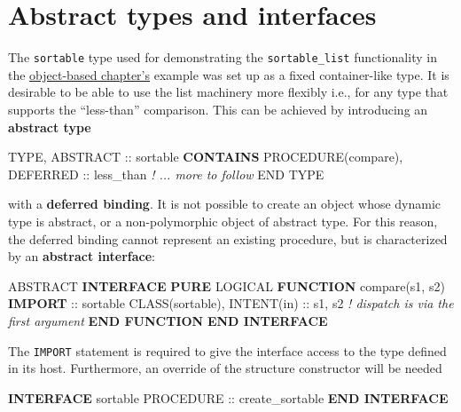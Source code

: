 \documentclass[
  paper=a4,
  ,captions=tableheading
]{scrartcl}
\newenvironment{Shaded}{\begin{snugshade}}{\end{snugshade}}
\newcommand{\CommentTok}[1]{\textcolor[rgb]{0.56,0.35,0.01}{\textit{#1}}}
\newcommand{\DataTypeTok}[1]{\textcolor[rgb]{0.13,0.29,0.53}{#1}}
\newcommand{\KeywordTok}[1]{\textcolor[rgb]{0.13,0.29,0.53}{\textbf{#1}}}
\newcommand{\NormalTok}[1]{#1}
\begin{document}
\section{Abstract types and
interfaces}\label{abstract-types-and-interfaces}

The \texttt{sortable} type used for demonstrating the
\texttt{sortable\_list} functionality in the
\hyperref[sec:oop_techniques]{object-based chapter's} example was set up
as a fixed container-like type. It is desirable to be able to use the
list machinery more flexibly i.e., for any type that supports the
``less-than'' comparison. This can be achieved by introducing an
\textbf{abstract type}

\begin{Shaded}
\begin{Highlighting}[]
\DataTypeTok{TYPE}\NormalTok{, }\DataTypeTok{ABSTRACT} \DataTypeTok{::}\NormalTok{ sortable}
\KeywordTok{CONTAINS}
   \DataTypeTok{PROCEDURE(compare)}\NormalTok{, }\DataTypeTok{DEFERRED} \DataTypeTok{::}\NormalTok{ less\_than}
   \CommentTok{! ... more to follow}
\DataTypeTok{END TYPE}
\end{Highlighting}
\end{Shaded}

with a \textbf{deferred binding}. It is not possible to create an object
whose dynamic type is abstract, or a non-polymorphic object of abstract
type. For this reason, the deferred binding cannot represent an existing
procedure, but is characterized by an \textbf{abstract interface}:

\begin{Shaded}
\begin{Highlighting}[]
\DataTypeTok{ABSTRACT} \KeywordTok{INTERFACE}
   \KeywordTok{PURE} \DataTypeTok{LOGICAL} \KeywordTok{FUNCTION}\NormalTok{ compare(s1, s2)}
      \KeywordTok{IMPORT} \DataTypeTok{::}\NormalTok{ sortable}
      \DataTypeTok{CLASS(sortable)}\NormalTok{, }\DataTypeTok{INTENT(in)} \DataTypeTok{::}\NormalTok{ s1, s2}
      \CommentTok{! dispatch is via the first argument}
   \KeywordTok{END FUNCTION}
\KeywordTok{END INTERFACE}
\end{Highlighting}
\end{Shaded}

The \texttt{IMPORT} statement is required to give the interface access
to the type defined in its host. Furthermore, an override of the
structure constructor will be needed

\begin{Shaded}
\begin{Highlighting}[]
\KeywordTok{INTERFACE}\NormalTok{ sortable}
   \DataTypeTok{PROCEDURE} \DataTypeTok{::}\NormalTok{ create\_sortable}
\KeywordTok{END INTERFACE}
\end{Highlighting}
\end{Shaded}
\end{document}
